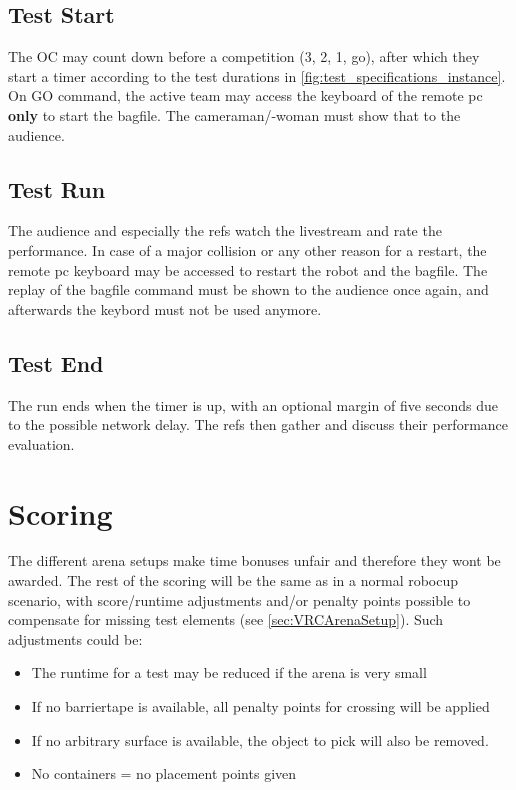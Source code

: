 \subsection{Test Start} 

The OC may count down before a competition (3, 2, 1, go), after which they start a timer according to the test durations in \ref{fig:test_specifications_instance}. On GO command, the active team may access the keyboard of the remote pc \textbf{only} to start the bagfile. The cameraman/-woman must show that to the audience.

\subsection{Test Run} 

The audience and especially the refs watch the livestream and rate the performance. In case of a major collision or any other reason for a restart, the remote pc keyboard may be accessed to restart the robot and the bagfile. The replay of the bagfile command must be shown to the audience once again, and afterwards the keybord must not be used anymore.

\subsection{Test End} 

The run ends when the timer is up, with an optional margin of five seconds due to the possible network delay. The refs then gather and discuss their performance evaluation.  

\section{Scoring} 
\label{sec:VRCScoring}

The different arena setups make time bonuses unfair and therefore they wont be awarded. 
The rest of the scoring will be the same as in a normal robocup scenario, with score/runtime adjustments and/or penalty points possible to compensate for missing test elements (see \ref{sec:VRCArenaSetup}). Such adjustments could be:

\begin{itemize}
\item The runtime for a test may be reduced if the arena is very small
\item If no barriertape is available, all penalty points for crossing will be applied
\item If no arbitrary surface is available, the object to pick will also be removed. 
\item No containers = no placement points given
\end{itemize}

